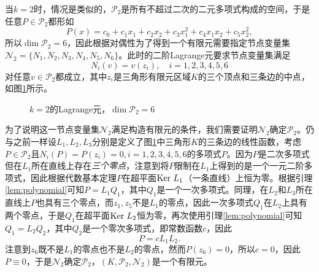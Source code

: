 \documentclass[a4paper,10pt]{ctexart}
\begin{document}
当$ k=2 $时，情况是类似的，$ \mathcal{P}_2 $是所有不超过二次的二元多项式构成的空间，于是任意$ P\in \mathcal{P}_2 $都形如
\[
    P(x) = c_0 + c_1 x_1 + c_2 x_2 + c_3 x_1^2 + c_4 x_1x_2 + c_5 x_2^2,
\]
所以$ \dim \mathcal{P}_2 = 6 $，因此根据对偶性为了得到一个有限元需要指定节点变量集$ \mathcal{N}_2 = \{N_1,N_2,N_3,N_4,N_5,N_6\} $。此时的二阶Lagrange元要求节点变量集满足
\begin{equation}
    N_i(v) = v(z_i),\quad i = 1,2,3,4,5,6
\end{equation}
对任意$ v\in \mathcal{P}_2 $都成立，其中$ z_i $是三角形有限元区域$ K $的三个顶点和三条边的中点，如图\ref{fig:Lagrange_2}所示。

\begin{figure}[htpb]
    \centering
    \caption{$ k=2 $的Lagrange元，$ \dim \mathcal{P}_2= 6 $}
    \label{fig:Lagrange_2}
\end{figure}

为了说明这一节点变量集$ \mathcal{N}_2 $满足构造有限元的条件，我们需要证明$ \mathcal{N}_2 $确定$ \mathcal{P}_2 $。仍与之前一样设$ L_1,L_2,L_3 $分别是定义了图\ref{fig:Lagrange_2}中三角形$ K $的三条边的线性函数，考虑$ P\in \mathcal{P}_2 $且$ N_i(P) = P(z_i) = 0,i=1,2,3,4,5,6 $的多项式$ P $。因为$ P $是二次多项式但在$ L_1 $所在直线上存在\emph{三个零点}，注意到将$ P $限制在$ L_1 $上得到的是一个一元二阶多项式，因此根据代数基本定理$ P $在超平面$ {\rm Ker}\ L_1 $（一条直线）上恒为零。根据引理\ref{lem:polynomial}可知$ P = L_1Q_1 $，其中$ Q_1 $是一个一次多项式。同理，在$ L_2 $和$ L_3 $所在直线上$ P $也具有三个零点，而$ z_1,z_5 $不是$ L_1 $的零点，因此一次多项式$ Q_1 $在$ L_2 $上具有两个零点，于是$ Q_1 $在超平面$ {\rm Ker}\ L_2 $恒为零，再次使用引理\ref{lem:polynomial}可知$ Q_1 = L_2 Q_2 $，其中$ Q_2 $是一个零次多项式，即常数函数$ c $，因此
\[
    P = cL_1L_2.
\]
注意到$ z_6 $既不是$ L_1 $的零点也不是$ L_2 $的零点，然而$ P(z_6)=0 $，所以$ c=0 $，因此$ P \equiv 0 $，于是$ \mathcal{N}_2 $确定$ \mathcal{P}_2 $，$ (K,\mathcal{P}_2,\mathcal{N}_2) $是一个有限元。
\end{document}
